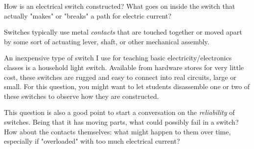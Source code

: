 

How is an electrical switch constructed?  What goes on inside the switch that actually "makes" or "breaks" a path for electric current?







Switches typically use metal {\it contacts} that are touched together or moved apart by some sort of actuating lever, shaft, or other mechanical assembly.







An inexpensive type of switch I use for teaching basic electricity/electronics classes is a household light switch.  Available from hardware stores for very little cost, these switches are rugged and easy to connect into real circuits, large or small.  For this question, you might want to let students disassemble one or two of these switches to observe how they are constructed.

This question is also a good point to start a conversation on the {\it reliability} of switches.  Being that it has moving parts, what could possibly fail in a switch?  How about the contacts themselves: what might happen to them over time, especially if "overloaded" with too much electrical current?




